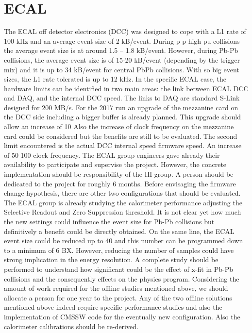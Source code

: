 \newpage

\section{ECAL\label{sec:ECAL}} 
The ECAL off detector electronics (DCC) was designed to cope with a L1 rate of 100 kHz and an average event size of 2
kB/event.  During p-p high-pu collisions the average event size is at around 1.5 – 1.8 kB/event. However, during Pb-Pb
collisions, the average event size is of 15-20 kB/event (depending by the trigger mix) and it is up to 34 kB/event for
central PbPb collisions. With so big event sizes, the L1 rate tolerated is up to 12 kHz. In the specific ECAL case, the
hardware limits can be identified in two main areas: the link between ECAL DCC and DAQ, and the internal DCC speed.  The
links to DAQ are standard S-Link designed for 200 MB/s. For the 2017 run an upgrade of the mezzanine card on the DCC
side including a bigger buffer is already planned. This upgrade should allow an increase of 10%
Also the increase of clock frequency on the mezzanine card could be considered but the benefits are still to be
evaluated. The second limit encountered is the actual DCC internal speed firmware speed. An increase of 50 %
100 %
clock frequency. The ECAL group engineers gave already their availability to participate and supervise the project.
However, the concrete implementation should be responsibility of the HI group. A person should be dedicated to the
project for roughly 6 months. Before envisaging the firmware change hypothesis, there are other two configurations that
should be evaluated. The ECAL group is already studying the calorimeter performance adjusting the Selective Readout and
Zero Suppression threshold. It is not clear yet how much the new settings could influence the event size for Pb-Pb
collisions but definitively a benefit could be directly obtained. On the same line, the ECAL event size could be reduced
up to 40 %
and this number can be programmed down to a minimum of 6 BX. However, reducing the number of samples could have strong
implication in the energy resolution. A complete study should be performed to understand how significant could be the
effect of x-fit in Pb-Pb collisions and the consequently effects on the physics program. Considering the amount of work
required for the offline studies mentioned above, we should allocate a person for one year to the project. Any of the
two offline solutions mentioned above indeed require specific performance studies and also the implementation of CMSSW
code for the eventually new configuration. Also the calorimeter calibrations should be re-derived. 




